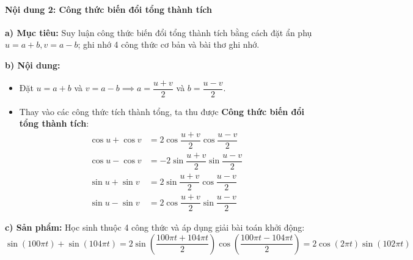 \documentclass[12pt, a4paper]{article}
\begin{document}
\paragraph{Nội dung 2: Công thức biến đổi tổng thành tích}
\textbf{a) Mục tiêu:} Suy luận công thức biến đổi tổng thành tích bằng cách đặt ẩn phụ $u = a + b, v = a - b$; ghi nhớ 4 công thức cơ bản và bài thơ ghi nhớ.

\textbf{b) Nội dung:}
\begin{itemize}[leftmargin=0.6cm]
    \item Đặt $u = a + b$ và $v = a - b \implies a = \dfrac{u + v}{2}$ và $b = \dfrac{u - v}{2}$.
    \item Thay vào các công thức tích thành tổng, ta thu được \textbf{Công thức biến đổi tổng thành tích}:
    \begin{align*}
        \cos u + \cos v &= 2\cos\dfrac{u + v}{2} \cos\dfrac{u - v}{2} \\
        \cos u - \cos v &= -2\sin\dfrac{u + v}{2} \sin\dfrac{u - v}{2} \\
        \sin u + \sin v &= 2\sin\dfrac{u + v}{2} \cos\dfrac{u - v}{2} \\
        \sin u - \sin v &= 2\cos\dfrac{u + v}{2} \sin\dfrac{u - v}{2}
    \end{align*}
\end{itemize}

\textbf{c) Sản phẩm:} Học sinh thuộc 4 công thức và áp dụng giải bài toán khởi động:
$$\sin(100\pi t) + \sin(104\pi t) = 2\sin\left(\dfrac{100\pi t + 104\pi t}{2}\right) \cos\left(\dfrac{100\pi t - 104\pi t}{2}\right) = 2\cos(2\pi t) \sin(102\pi t)$$
\end{document}
